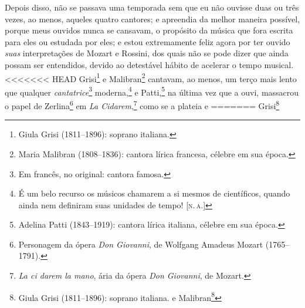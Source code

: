 {{{{{{{{{{{{{{{{{{{{{{{{{{{{{{{{{{{{{{{{{{{{{{{{{{{{{{{{{{{{{{{{{{{{{{{{{Depois disso, não se passava uma temporada sem que eu não ouvisse duas
ou três vezes, ao menos, aqueles quatro cantores; e apreendia da melhor
maneira possível, porque meus ouvidos nunca se cansavam, o propósito da
música que fora escrita para eles ou estudada por eles; e estou
extremamente feliz agora por ter ouvido \textit{suas} interpretações de
Mozart e Rossini, dos quais não se pode dizer que ainda possam ser
entendidos, devido ao detestável hábito de acelerar o tempo musical.
<<<<<<< HEAD
Grisi\footnote{Giula Grisi (1811--1896): soprano italiana.}
e Malibran\footnote{Maria Malibran (1808--1836): cantora lírica francesa,
  célebre em sua época.} cantavam, ao menos, um terço
mais lento que qualquer \textit{cantatrice}\footnote{Em francês, no
  original: cantora famosa.} moderna,\footnote{É um belo
  recurso os músicos chamarem a si mesmos de científicos, quando ainda
  nem definiram suas unidades de tempo! {[}\textsc{n.\,a.}{]}} e
Patti,\footnote{Adelina Patti (1843--1919): cantora lírica italiana,
  célebre em sua época.} na última vez que a ouvi,
massacrou o papel de Zerlina\footnote{Personagem da ópera \textit{Don
  Giovanni}, de Wolfgang Amadeus Mozart (1765--1791).} em
\textit{La Cidarem},\footnote{\textit{La ci darem la mano}, ária da ópera
  \textit{Don Giovanni}, de Mozart.} como se a plateia e
=======
Grisi\footnote{Giula Grisi (1811--1896): soprano italiana. 
e Malibran\footnote{Maria Malibran (1808--1836): cantora lírica francesa,
  célebre em sua época.  cantavam, ao menos, um terço
mais lento que qualquer \textit{cantatrice}\footnote{Em francês, no
  original: cantora famosa.  moderna,\footnote{É um belo
  recurso os músicos chamarem a si mesmos de científicos, quando ainda
  nem definiram suas unidades de tempo! {[}\textsc{n.\,a.}{]}} e
Patti,\footnote{Adelina Patti (1843--1919): cantora lírica italiana,
  célebre em sua época.  na última vez que a ouvi,
massacrou o papel de Zerlina\footnote{Personagem da ópera \textit{Don
  Giovanni}, de Wolfgang Amadeus Mozart (1765--1791).  em
\textit{La Cidarem},\footnote{\textit{La ci darem la mano}, ária da ópera
  \textit{Don Giovanni}, de Mozart.  como se a plateia e
>>>>>>> 7ef31cc2a6d5603f856fee4c85bc83700040648c
ela tivessem o único objetivo de acabar com a ária de Mozart o mais
rápido possível.

}}}}}}}}}}}}}}}}}}}}}}}}}}}}}}}}}}}}}}}}}}}}}}}}}}}}}}}}}}}}}}}}}}}}}}}}}}}}}}}
